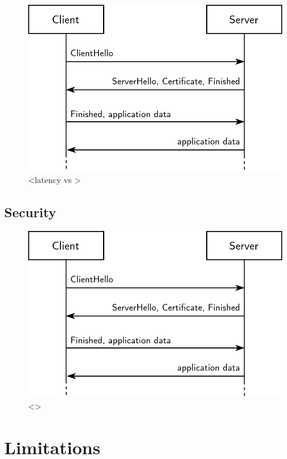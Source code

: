 \begin{figure}[ht]
\centerline{\includegraphics[width=120mm]{images/tls-handshake.png}}
\caption[TODO performance graph]{<latency vs >}
\label{performance_graph_figure}
\end{figure}

\subsection{Security}

\blindtext

\begin{figure}[ht]
\centerline{\includegraphics[width=120mm]{images/tls-handshake.png}}
\caption[TODO security graph using entropy or something]{<>}
\label{security_graph_figure}
\end{figure}








\section{Limitations}

